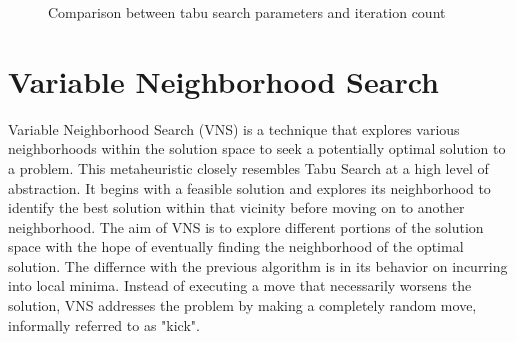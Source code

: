 \begin{figure}[H]
	\centering
	\caption{Comparison between tabu search parameters and iteration count \label{fig:tabuIters}}
\end{figure}

\section{Variable Neighborhood Search}

Variable Neighborhood Search (VNS) is a technique that explores various neighborhoods within the solution space to seek a potentially optimal solution to a problem.
This metaheuristic closely resembles Tabu Search at a high level of abstraction.
It begins with a feasible solution and explores its neighborhood to identify the best solution within that vicinity before moving on to another neighborhood.
The aim of VNS is to explore different portions of the solution space with the hope of eventually finding the neighborhood of the optimal solution.
The differnce with the previous algorithm is in its behavior on incurring into local minima.
Instead of executing a move that necessarily worsens the solution, VNS addresses the problem by making a completely random move, informally referred to as "kick".

